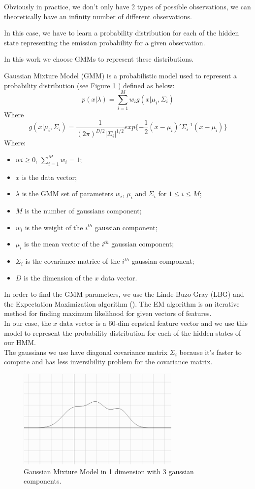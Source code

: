 \documentclass{techrep} %
\begin{document}
Obviously in practice, we don't only have 2 types of possible
observations, we can theoretically have an infinity number of
different observations.

In this case, we have to learn a probability distribution for each of
the hidden state representing the emission probability for a given
observation.

In this work we choose GMMs to represent these distributions.

Gaussian Mixture Model (GMM) is a probabilistic model used to
represent a probability distribution (see Figure \ref{gmmschem} )
defined as below:\\
$$ p(x|\lambda) = \sum_{i=1}^{M} w_i g(x|\mu_i,\Sigma_i)$$
Where\\
$$ g(x|\mu_i,\Sigma_i) =
\frac{1}{(2\pi)^{D/2}|\Sigma_i|^{1/2}}exp{\{-\frac{1}{2}(x-\mu_i)'\Sigma_i^{-1}(x-\mu_i)\}} $$
Where:
\begin{itemize}
\item $wi \ge 0$, $\sum_{i=1}^{M} w_i = 1$;
\item $x$ is the data vector;
\item $\lambda$ is the GMM set of parameters $w_i$, $\mu_i$ and
  $\Sigma_i$ for $1 \leq i \leq M$;
\item $M$ is the number of gaussians component;
\item $w_i$ is the weight of the $i^{th}$ gaussian component;
\item $\mu_i$ is the mean vector of the $i^{th}$ gaussian component;
\item $\Sigma_i$ is the covariance matrice of the $i^{th}$ gaussian
  component;
\item $D$ is the dimension of the $x$ data vector.
\end{itemize}
In order to find the GMM parameters, we use the Linde-Buzo-Gray (LBG)
and the Expectation Maximization algorithm (\cite{EM}). The EM
algorithm is an iterative method for finding maximum likelihood for
given vectors of features.\\ In our case, the $x$ data vector is a
60-dim cepstral feature vector and we use this model to represent the
probability distribution for each of the hidden states of our
HMM.\\ The gaussians we use have diagonal covariance matrix $\Sigma_i$
because it's faster to compute and has less inversibility problem for
the covariance matrix.

\begin{figure}[H]
  \centering \includegraphics[width=300px]{gmm}
  \caption{Gaussian Mixture Model in 1 dimension with 3 gaussian components.}
  \label{gmmschem}
\end{figure}
\end{document}
